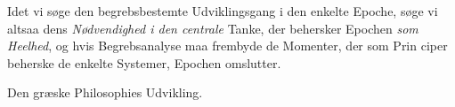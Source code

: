 Idet vi søge den begrebsbestemte Udviklingsgang i den
enkelte Epoche, søge vi altsaa dens \emph{Nødvendighed i den
centrale} Tanke, der behersker Epochen \emph{som Heelhed}, og
hvis Begrebsanalyse maa frembyde de Momenter, der som Prin\-%
ciper beherske de enkelte Systemer, Epochen omslutter.

\begin{center}
{\Large Den græske Philosophies Udvikling.}
\end{center}
\divrule

